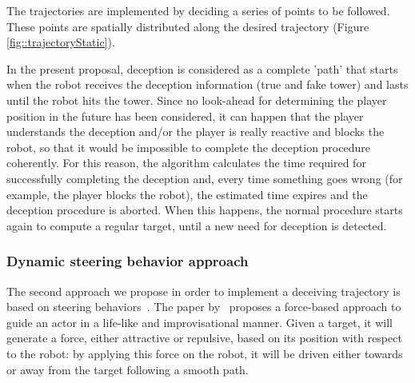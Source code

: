 The trajectories are implemented by deciding a series of points to be followed. These points are spatially distributed along the desired trajectory (Figure \ref{fig::trajectoryStatic}).

In the present proposal, deception is considered as a complete 'path' that starts when the robot receives the deception information (true and fake tower) and lasts until the robot hits the tower. Since no look-ahead for determining the player position in the future has been considered, it can happen that the player understands the deception and/or the player is really reactive and blocks the robot, so that it would be impossible to complete the deception procedure coherently.
For this reason, the algorithm calculates the time required for successfully completing the deception and, every time something goes wrong (for example, the player blocks the robot), the estimated time expires and the deception procedure is aborted. When this happens, the normal procedure starts again to compute a regular target, until a new need for deception is detected.

\subsubsection{Dynamic steering behavior approach}
The second approach we propose in order to implement a deceiving trajectory is based on steering behaviors~\citep{reynolds_steering_1999}. The paper by~\cite{reynolds_steering_1999} proposes a force-based approach to guide an actor in a life-like and improvisational manner. Given a target, it will generate a force, either attractive or repulsive, based on its position with respect to the robot: by applying this force on the robot, it will be driven either towards or away from the target following a smooth path.

